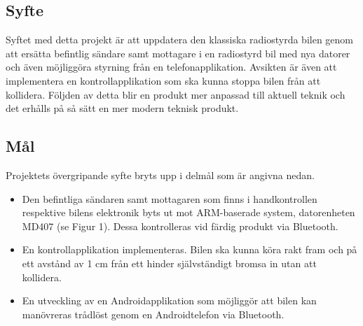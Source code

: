 \documentclass[a4paper]{article}
\begin{document}
\subsection{Syfte}

Syftet med detta projekt är att uppdatera den klassiska radiostyrda bilen genom att ersätta befintlig sändare samt mottagare i en radiostyrd bil med nya datorer och även möjliggöra styrning från en telefonapplikation. Avsikten är även att implementera en kontrollapplikation som ska kunna stoppa bilen från att kollidera. Följden av detta blir en produkt mer anpassad till aktuell teknik och det erhålls på så sätt en mer modern teknisk produkt.


\subsection{Mål}
Projektets övergripande syfte bryts upp i delmål som är angivna nedan.

\begin{itemize}
\item Den befintliga sändaren samt mottagaren som finns i handkontrollen respektive bilens elektronik byts ut mot ARM-baserade system, datorenheten MD407 (se Figur 1). Dessa kontrolleras vid färdig produkt via Bluetooth.
\item En kontrollapplikation implementeras. Bilen ska kunna köra rakt fram och på ett avstånd av 1 cm från ett hinder självständigt bromsa in utan att kollidera.
\item En utveckling av en Androidapplikation som möjliggör att bilen kan manövreras trådlöst genom en Androidtelefon via Bluetooth.
\end{itemize}
\end{document}
